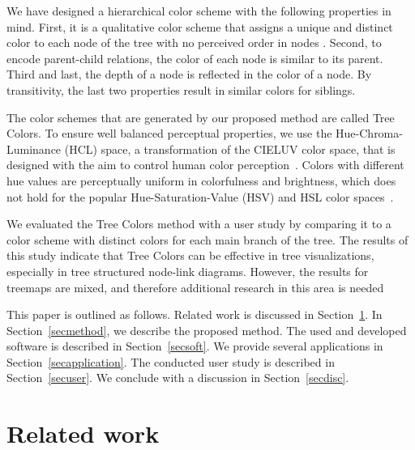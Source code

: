 \documentclass[journal]{vgtc}                %
\begin{document}
We have designed a hierarchical color scheme with the following properties in mind. First, it is a qualitative color scheme that assigns a unique and distinct color to each node of the tree with no perceived order in nodes \cite{brewer03, zeileis2009}. Second, to encode parent-child relations, the color of each node is similar to its parent. Third and last, the depth of a node is reflected in the color of a node. By transitivity, the last two properties result in similar colors for siblings.

The color schemes that are generated by our proposed method are called Tree Colors. To ensure well
balanced perceptual properties, we use the Hue-Chroma-Luminance (HCL) space, a transformation of the CIELUV color space, that is designed with the aim to control human color perception~\cite{ihaka2003}. Colors with different hue values are perceptually uniform in colorfulness and brightness, which does not hold for the popular Hue-Saturation-Value (HSV) and HSL color spaces~\cite{zeileis2009}.

We evaluated the Tree Colors method with a user study by comparing it to a color scheme with distinct colors for each main branch of the tree. The results of this study indicate
that Tree Colors can be effective in tree visualizations, especially in tree structured node-link diagrams. However, the results for treemaps
are mixed, and therefore additional research in this area is needed


This paper is outlined as follows. Related work is discussed in Section~\ref{secrelated}. In Section~\ref{secmethod}, we describe the proposed method. The used and developed software is described in Section~\ref{secsoft}. We provide several applications in Section~\ref{secapplication}. The conducted user study is described in Section~\ref{secuser}. We conclude with a discussion in Section~\ref{secdisc}.


\section{Related work}\label{secrelated}
\end{document}
